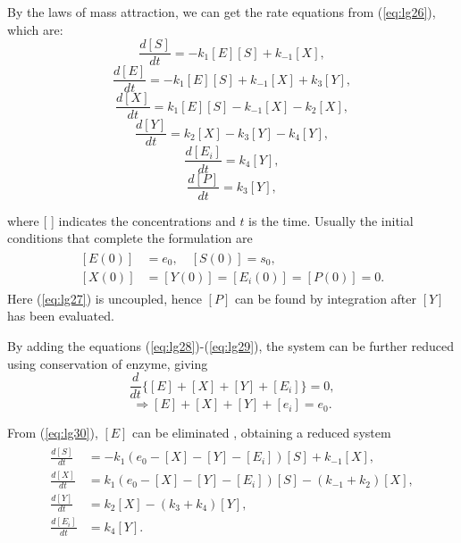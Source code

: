 \documentclass[a4paper]{report}
\theoremstyle{definition}
\begin{document}
By the laws of mass attraction, we can get the rate equations from (\ref{eq:lg26}), which are:
\begin{equation}
\frac{d[S]}{dt}=-k_1[E][S]+k_{-1}[X], \label{eq:lg28}
\end{equation}
\begin{equation}
\frac{d[E]}{dt}=-k_1[E][S]+k_{-1}[X]+k_3[Y],
\end{equation}
\begin{equation}
\frac{d[X]}{dt}=k_1[E][S]-k_{-1}[X]-k_2[X],
\end{equation}
\begin{equation}
\frac{d[Y]}{dt}=k_2[X]-k_3[Y]-k_4[Y],
\end{equation}
\begin{equation}
\frac{d[E_i]}{dt}=k_4[Y], \label{eq:lg29}
\end{equation}
\begin{equation}
\frac{d[P]}{dt}=k_3[Y], \label{eq:lg27}
\end{equation}

where [ ] indicates the concentrations and $t$ is the time.
Usually the initial conditions that complete the formulation are
\begin{align}
\begin{split}
[E(0)]&=e_0, \quad [S(0)]=s_0 ,
\\
[X(0)]&=[Y(0)]=[E_i(0)]=[P(0)]=0.
\end{split}
\label{eq:lg34}
\end{align}
Here (\ref{eq:lg27}) is uncoupled, hence $[P]$ can be found by integration after $[Y]$ has been evaluated.

By adding the equations (\ref{eq:lg28})-(\ref{eq:lg29}), the system can be further reduced using conservation of enzyme, giving
\begin{equation}
\frac{d}{dt}\{[E]+[X]+[Y]+[E_i]\}=0,
\end{equation}
\begin{equation}
\Rightarrow [E]+[X]+[Y]+[e_i]=e_0.
\label{eq:lg30}
\end{equation}

From (\ref{eq:lg30}), $[E]$ can be eliminated , obtaining a reduced system
\begin{align}
\begin{split}
\frac{d[S]}{dt}&=-k_1(e_0-[X]-[Y]-[E_i])[S]+k_{-1}[X], \\
\frac{d[X]}{dt}&=k_1(e_0-[X]-[Y]-[E_i])[S]-(k_{-1}+k_2)[X], \\
\frac{d[Y]}{dt}&=k_2[X]-(k_3+k_4)[Y], \\
\frac{d[E_i]}{dt}&=k_4[Y].
\end{split}
\label{eq:lg32}
\end{align}
\end{document}
